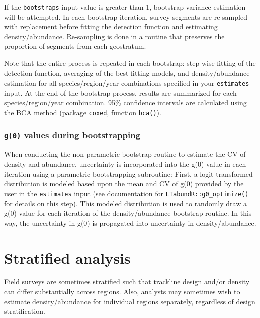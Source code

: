 \documentclass[
]{book}
\begin{document}
If the \texttt{bootstraps} input value is greater than 1, bootstrap variance estimation will be attempted. In each bootstrap iteration, survey segments are re-sampled with replacement before fitting the detection function and estimating density/abundance. Re-sampling is done in a routine that preserves the proportion of segments from each geostratum.

Note that the entire process is repeated in each bootstrap: step-wise fitting of the detection function, averaging of the best-fitting models, and density/abundance estimation for all species/region/year combinations specified in your \texttt{estimates} input. At the end of the bootstrap process, results are summarized for each species/region/year combination. 95\% confidence intervals are calculated using the BCA method (package \texttt{coxed}, function \texttt{bca()}).

\hypertarget{g0-values-during-bootstrapping}{%
\subsection*{\texorpdfstring{\texttt{g(0)} values during bootstrapping}{g(0) values during bootstrapping}}\label{g0-values-during-bootstrapping}}

When conducting the non-parametric bootstrap routine to estimate the CV of density and abundance, uncertainty is incorporated into the g(0) value in each iteration using a parametric bootstrapping subroutine: First, a logit-transformed distribution is modeled based upon the mean and CV of g(0) provided by the user in the \texttt{estimates} input (see documentation for \texttt{LTabundR::g0\_optimize()} for details on this step). This modeled distribution is used to randomly draw a g(0) value for each iteration of the density/abundance bootstrap routine. In this way, the uncertainty in g(0) is propagated into uncertainty in density/abundance.

\hypertarget{destratify}{%
\chapter{Stratified analysis}\label{destratify}}

Field surveys are sometimes stratified such that trackline design and/or density can differ substantially across regions. Also, analysts may sometimes wish to estimate density/abundance for individual regions separately, regardless of design stratification.
\end{document}
